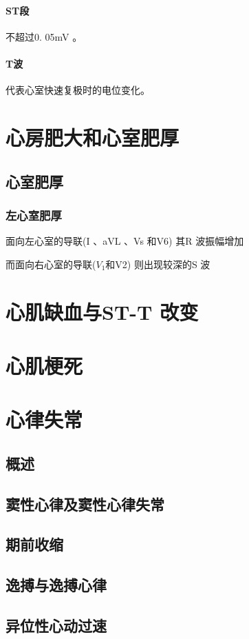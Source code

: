 \documentclass[UTF8]{ctexbook}
\begin{document}
\paragraph{ST段}不超过0. 05mV 。
\paragraph{T波}代表心室快速复极时的电位变化。

\section{心房肥大和心室肥厚}
\subsection{心室肥厚}
\subsubsection{左心室肥厚}
面向左心室的导联(I 、aVL 、Vs 和V6) 其R 波振幅增加

而面向右心室的导联($V_1$和V2) 则出现较深的S 波

\section{心肌缺血与ST-T 改变}

\section{心肌梗死}

\section{心律失常}
\subsection{概述}
\subsection{窦性心律及窦性心律失常}
\subsection{期前收缩}
\subsection{逸搏与逸搏心律}
\subsection{异位性心动过速}
\end{document}
